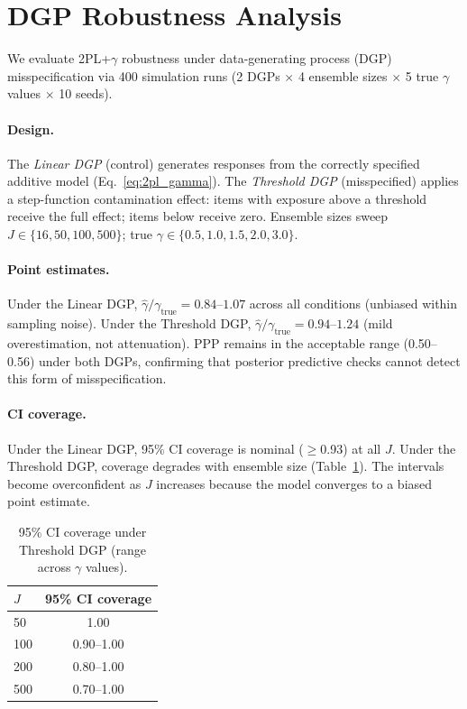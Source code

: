 \section{DGP Robustness Analysis}
\label{sec:threshold_dgp}

We evaluate 2PL+$\gamma$ robustness under data-generating process (DGP) misspecification via 400 simulation runs (2 DGPs $\times$ 4 ensemble sizes $\times$ 5 true $\gamma$ values $\times$ 10 seeds).

\paragraph{Design.} The \emph{Linear DGP} (control) generates responses from the correctly specified additive model (Eq.~\ref{eq:2pl_gamma}). The \emph{Threshold DGP} (misspecified) applies a step-function contamination effect: items with exposure above a threshold receive the full effect; items below receive zero. Ensemble sizes sweep $J \in \{16, 50, 100, 500\}$; true $\gamma \in \{0.5, 1.0, 1.5, 2.0, 3.0\}$.

\paragraph{Point estimates.} Under the Linear DGP, $\hat{\gamma}/\gamma_{\text{true}} = 0.84$--$1.07$ across all conditions (unbiased within sampling noise). Under the Threshold DGP, $\hat{\gamma}/\gamma_{\text{true}} = 0.94$--$1.24$ (mild overestimation, not attenuation). PPP remains in the acceptable range (0.50--0.56) under both DGPs, confirming that posterior predictive checks cannot detect this form of misspecification.

\paragraph{CI coverage.} Under the Linear DGP, 95\% CI coverage is nominal ($\geq$0.93) at all $J$. Under the Threshold DGP, coverage degrades with ensemble size (Table~\ref{tab:dgp_coverage}). The intervals become overconfident as $J$ increases because the model converges to a biased point estimate.

\begin{table}[h]
\centering
\caption{95\% CI coverage under Threshold DGP (range across $\gamma$ values).}
\label{tab:dgp_coverage}
\footnotesize
\begin{tabular}{lc}
\toprule
$J$ & 95\% CI coverage \\
\midrule
50 & 1.00 \\
100 & 0.90--1.00 \\
200 & 0.80--1.00 \\
500 & 0.70--1.00 \\
\bottomrule
\end{tabular}
\end{table}

